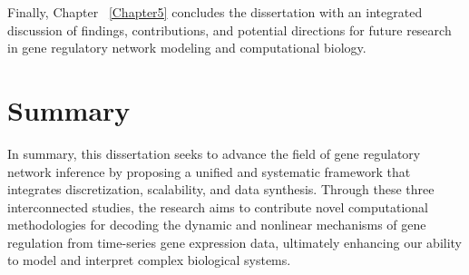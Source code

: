 Finally, Chapter ~\ref{Chapter5} concludes the dissertation with an integrated discussion of findings, contributions, and potential directions for future research in gene regulatory network modeling and computational biology.
\section{Summary}
In summary, this dissertation seeks to advance the field of gene regulatory network inference by proposing a unified and systematic framework that integrates discretization, scalability, and data synthesis. Through these three interconnected studies, the research aims to contribute novel computational methodologies for decoding the dynamic and nonlinear mechanisms of gene regulation from time-series gene expression data, ultimately enhancing our ability to model and interpret complex biological systems.
